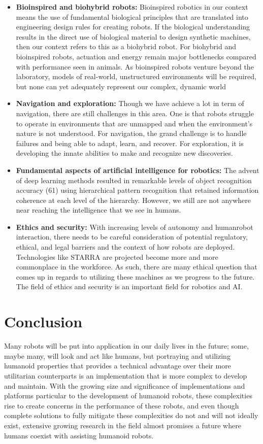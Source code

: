 \documentclass[conference]{IEEEtran}
\begin{document}
\begin{itemize}
\item \textbf{Bioinspired and biohybrid robots:} Bioinspired robotics in our context means the  use of fundamental biological principles that are translated into engineering design rules for creating robots. If the biological understanding results in the direct use of biological material to design synthetic machines, then our context refers to this as a biohybrid robot. For biohybrid and bioinspired robots, actuation and energy remain major bottlenecks compared with performance seen in animals. As bioinspired robots venture beyond the laboratory, models of real-world, unstructured environments will be required, but none can yet adequately represent our complex, dynamic world
\item \textbf{Navigation and exploration:} Though we have achieve a lot in term of navigation, there are still challenges in this area. One is that robots struggle to operate in environments that are unmapped and when the environment's nature is not understood\autocite{yang2018grand}. For navigation, the grand challenge is to handle failures and being able to adapt, learn, and recover. For exploration, it is developing the innate abilities to make and recognize new discoveries.
\item \textbf{Fundamental aspects of artificial intelligence for robotics:} The advent of deep learning methods resulted in remarkable levels of object recognition accuracy (61) using hierarchical pattern recognition that retained information coherence at each level of the hierarchy. However, we still are not anywhere near reaching the intelligence that we see in humans.
\item \textbf{Ethics and security:} With increasing levels of autonomy and humanrobot interaction, there needs to be careful consideration of potential regulatory, ethical, and legal barriers and the context of how robots are deployed. Technologies like STARRA are projected become more and more commonplace in the workforce. As such, there are many ethical question that comes up in regards to utilizing these machines as we progress to the future. The field of ethics and security is an important field for robotics and AI.
\end{itemize}

\section{Conclusion}
Many robots will be put into application in our daily lives in the future; some, maybe many, will look and act like humans, but portraying and utilizing humanoid properties that provides a technical advantage over their more utilitarian counterparts is an implementation that is more complex to develop and maintain. With the growing size and significance of implementations and platforms particular to the development of humanoid robots, these complexities rise to create concerns in the performance of these robots, and even though complete solutions to fully mitigate these complexities do not and will not ideally exist, extensive growing research in the field almost promises a future where humans coexist with assisting humanoid robots.

\printbibliography{}
\end{document}
